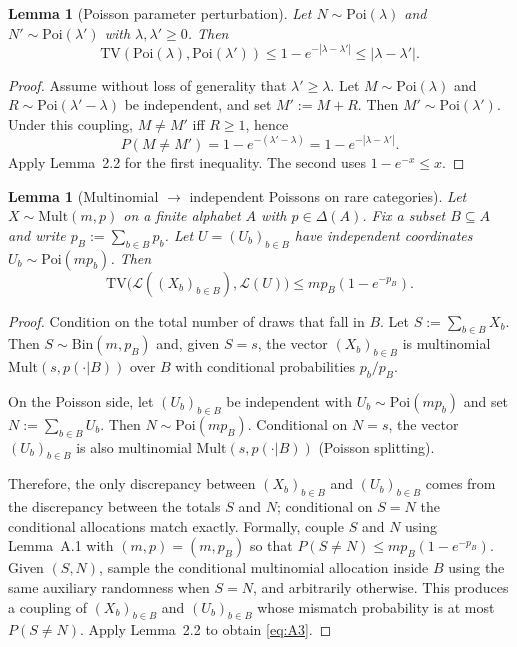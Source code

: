 \documentclass{article}
\newtheorem{lemma}[theorem]{Lemma}
\begin{document}
\begin{lemma}[Poisson parameter perturbation]
Let $N \sim \mathrm{Poi}(\lambda)$ and $N' \sim \mathrm{Poi}(\lambda')$ with $\lambda, \lambda' \geq 0$. Then
\[
\mathrm{TV}(\mathrm{Poi}(\lambda), \mathrm{Poi}(\lambda')) \leq 1 - e^{-|\lambda - \lambda'|} \leq |\lambda - \lambda'|.
\]
\end{lemma}

\begin{proof}
Assume without loss of generality that $\lambda' \geq \lambda$. Let $M \sim \mathrm{Poi}(\lambda)$ and $R \sim \mathrm{Poi}(\lambda' - \lambda)$ be
independent, and set $M' := M + R$. Then $M' \sim \mathrm{Poi}(\lambda')$. Under this coupling, $M \neq M'$ iff $R \geq 1$,
hence
\[
P(M \neq M') = 1 - e^{-(\lambda' - \lambda)} = 1 - e^{-|\lambda - \lambda'|}.
\]
Apply Lemma~2.2 for the first inequality. The second uses $1 - e^{-x} \leq x$.
\end{proof}

\begin{lemma}[Multinomial $\to$ independent Poissons on rare categories]
Let $X \sim \mathrm{Mult}(m, p)$ on a finite alphabet $A$ with $p \in \Delta(A)$. Fix a subset $B \subseteq A$ and write $p_B := \sum_{b \in B} p_b$. Let $U = (U_b)_{b \in B}$ have independent coordinates $U_b \sim \mathrm{Poi}(m p_b)$. Then
\begin{equation}
\mathrm{TV}\bigl(\mathcal{L}((X_b)_{b \in B}), \mathcal{L}(U)\bigr) \leq m p_B (1 - e^{-p_B}). \label{eq:A3}
\end{equation}
\end{lemma}

\begin{proof}
Condition on the total number of draws that fall in $B$. Let $S := \sum_{b \in B} X_b$. Then $S \sim \mathrm{Bin}(m, p_B)$ and, given $S = s$, the vector $(X_b)_{b \in B}$ is multinomial $\mathrm{Mult}(s, p(\cdot|B))$ over $B$ with conditional probabilities $p_b/p_B$.

On the Poisson side, let $(U_b)_{b \in B}$ be independent with $U_b \sim \mathrm{Poi}(m p_b)$ and set $N := \sum_{b \in B} U_b$.
Then $N \sim \mathrm{Poi}(m p_B)$. Conditional on $N = s$, the vector $(U_b)_{b \in B}$ is also multinomial $\mathrm{Mult}(s, p(\cdot|B))$
(Poisson splitting).

Therefore, the only discrepancy between $(X_b)_{b \in B}$ and $(U_b)_{b \in B}$ comes from the discrepancy
between the totals $S$ and $N$; conditional on $S = N$ the conditional allocations match exactly.
Formally, couple $S$ and $N$ using Lemma~A.1 with $(m, p) = (m, p_B)$ so that $P(S \neq N) \leq m p_B(1 - e^{-p_B})$. Given $(S, N)$, sample the conditional multinomial allocation inside $B$ using the same auxiliary
randomness when $S = N$, and arbitrarily otherwise. This produces a coupling of $(X_b)_{b \in B}$ and
$(U_b)_{b \in B}$ whose mismatch probability is at most $P(S \neq N)$. Apply Lemma~2.2 to obtain \eqref{eq:A3}.
\end{proof}
\end{document}
